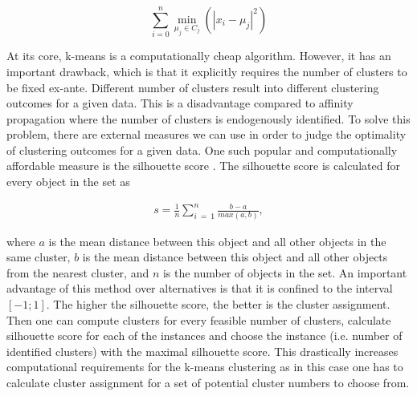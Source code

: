 \documentclass[a4paper,12pt]{article}
\begin{document}
$$\sum_{i=0}^{n}\min_{\mu_j\in C_j}\left(\left.\left|x_i-\mu_j\right|^2\right.\right)$$

At its core, k-means is a computationally cheap algorithm. However, it has an important drawback, which is that it explicitly requires the number of clusters to be fixed ex-ante. Different number of clusters result into different clustering outcomes for a given data. This is a disadvantage compared to affinity propagation where the number of clusters is endogenously identified. To solve this problem, there are external measures we can use in order to judge the optimality of clustering outcomes for a given data. One such popular and computationally affordable measure is the silhouette score \citep{rousseeuw1987silhouettes}. The silhouette score is calculated for every object in the set as

\begin{align}\label{eq:silhouetteCalculation}
    s=\frac{1}{n}\sum_{i\ =\ 1}^{n}{\frac{b-a}{max\left(a,b\right)}},
\end{align}

where  $a$ is the mean distance between this object and all other objects in the same cluster, $b$ is the mean distance between this object and all other objects from the nearest cluster, and $n$ is the number of objects in the set. An important advantage of this method over alternatives is that it is confined to the interval $[-1;1]$. The higher the silhouette score, the better is the cluster assignment. Then one can compute clusters for every feasible number of clusters, calculate silhouette score for each of the instances and choose the instance (i.e. number of identified clusters) with the maximal silhouette score. This drastically increases computational requirements for the k-means clustering as in this case one has to calculate cluster assignment for a set of potential cluster numbers to choose from.


\newpage
\section{}\label{appendix:LogitMixedAndFixedEffectResults}
\end{document}
